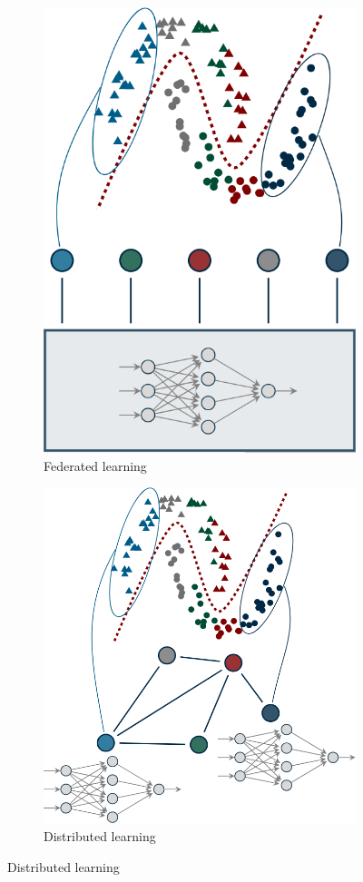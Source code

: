 \begin{figure}[H]
    \centering
    \begin{subfigure}{0.4\linewidth}
        \centering
        \includegraphics[width=0.55\linewidth]{./img/federated_learning.png}
        \caption{Federated learning}
    \end{subfigure}
    \begin{subfigure}{0.4\linewidth}
        \centering
        \includegraphics[width=0.7\linewidth]{./img/distributed_learning.png}
        \caption{Distributed learning}
    \end{subfigure}
\end{figure}



